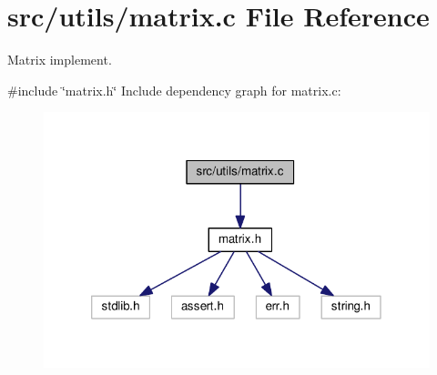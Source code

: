 \section{src/utils/matrix.c File Reference}
\label{matrix_8c}


Matrix implement.  


{\ttfamily \#include \char`\"{}matrix.\+h\char`\"{}}\newline
Include dependency graph for matrix.\+c\+:\nopagebreak
\begin{figure}[H]
\begin{center}
\leavevmode
\includegraphics[width=320pt]{matrix_8c__incl}
\end{center}
\end{figure}
